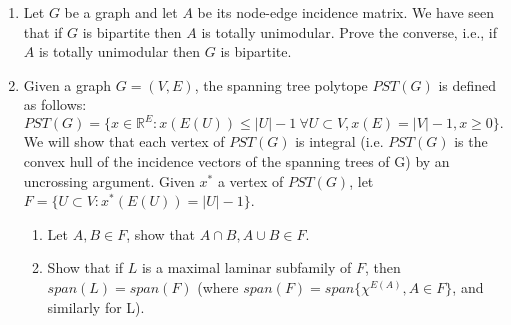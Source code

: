 \documentclass[11pt]{article}
\newcommand{\setR}{\mathbb{R}}
\begin{document}
\begin{enumerate}[1)]
\item Let $G$ be a graph and let $A$ be its node-edge incidence matrix. We have seen that if $G$ is
bipartite then $A$ is totally unimodular. Prove the converse, i.e., if $A$ is totally unimodular then $G$
is bipartite.


\item Given a graph $G=(V,E)$, the spanning tree polytope $PST(G)$ is defined as follows:
$$PST (G) = \{x∈\setR^E : x(E(U)) ≤|U|−1 \ ∀U ⊂V, x(E) = |V|−1, x≥0\}.$$
We will show that each vertex of $PST(G)$ is integral (i.e. $PST (G)$ is the convex hull of the incidence
vectors of the spanning trees of G) by an uncrossing argument. 
Given $x^*$ a vertex of $PST (G)$, let $F= \{U ⊂V : x^*(E(U)) = |U|−1\}$.
\begin{enumerate}
\item Let $A,B ∈F$, show that $A∩B,A∪B ∈F$.
\item Show that if $L$ is a maximal laminar subfamily of $F$, then $span(L) = span(F)$ (where
$span(F) = span\{χ^{E(A)},A∈F\}$, and similarly for L).
\end{enumerate}







\end{enumerate}



  
\end{document}
